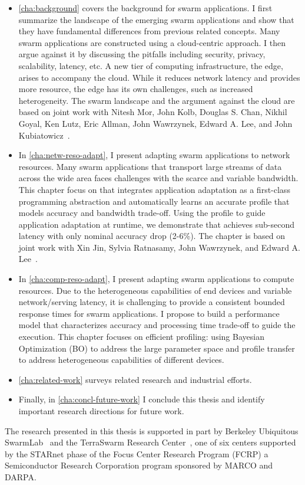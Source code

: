 \documentclass[thesis.tex]{subfiles}
\begin{document}
\begin{itemize}[topsep=5pt]
\item \autoref{cha:background} covers the background for swarm applications. I
  first summarize the landscape of the emerging swarm applications and show that
  they have fundamental differences from previous related concepts.  Many swarm
  applications are constructed using a cloud-centric approach. I then argue
  against it by discussing the pitfalls including security, privacy,
  scalability, latency, etc. A new tier of computing infrastructure, the edge,
  arises to accompany the cloud. While it reduces network latency and provides
  more resource, the edge has its own challenges, such as increased
  heterogeneity. The swarm landscape and the argument against the cloud are
  based on joint work with Nitesh Mor, John Kolb, Douglas S. Chan, Nikhil Goyal,
  Ken Lutz, Eric Allman, John Wawrzynek, Edward A. Lee, and John
  Kubiatowicz~\cite{zhang2015cloud}.
\item In \autoref{cha:netw-reso-adapt}, I present adapting swarm applications to
  network resources. Many swarm applications that transport large streams of
  data across the wide area faces challenges with the scarce and variable
  bandwidth. This chapter focus on \awstream{} that integrates application
  adaptation as a first-class programming abstraction and automatically learns
  an accurate profile that models accuracy and bandwidth trade-off. Using the
  profile to guide application adaptation at runtime, we demonstrate that
  \awstream{} achieves sub-second latency with only nominal accuracy drop
  (2-6\%).  The chapter is based on joint work with Xin Jin, Sylvia Ratnasamy,
  John Wawrzynek, and Edward A. Lee~\cite{zhang2018awstream}.
\item In \autoref{cha:comp-reso-adapt}, I present adapting swarm applications to
  compute resources. Due to the heterogeneous capabilities of end devices and
  variable network/serving latency, it is challenging to provide a consistent
  bounded response times for swarm applications. I propose to build a
  performance model that characterizes accuracy and processing time trade-off to
  guide the execution. This chapter focuses on efficient profiling: using
  Bayesian Optimization (BO) to address the large parameter space and profile
  transfer to address heterogeneous capabilities of different devices.
\item \autoref{cha:related-work} surveys related research and industrial
  efforts.
\item Finally, in \autoref{cha:concl-future-work} I conclude this thesis and
  identify important research directions for future work.
\end{itemize}

The research presented in this thesis is supported in part by Berkeley
Ubiquitous SwarmLab~\cite{swarmlab} and the TerraSwarm Research
Center~\cite{terraswarm}, one of six centers supported by the STARnet phase of
the Focus Center Research Program (FCRP) a Semiconductor Research Corporation
program sponsored by MARCO and DARPA.
\end{document}

